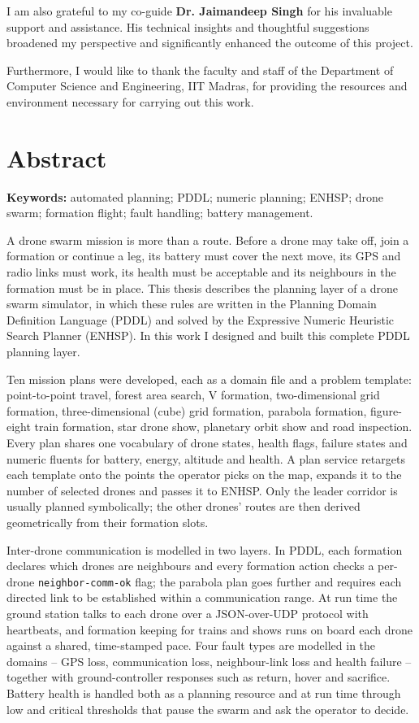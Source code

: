 \documentclass[11pt,a4paper,oneside]{report}
\newcommand{\coadvisor}{Dr. Jaimandeep Singh}
\newlength{\tocgap}\setlength{\tocgap}{1.0em}
\newcommand{\frontentry}[2]{\addvspace{\tocgap}\noindent\textbf{#1}\hfill\textbf{#2}\par}
\newcommand{\addfront}[1]{\addtocontents{toc}{\protect\frontentry{#1}{\thepage}}}
\newcommand{\code}[1]{\texttt{#1}}
\begin{document}
I am also grateful to my co-guide \textbf{\coadvisor} for his invaluable support and assistance.
His technical insights and thoughtful suggestions broadened my perspective and significantly
enhanced the outcome of this project.

Furthermore, I would like to thank the faculty and staff of the Department of Computer Science
and Engineering, IIT Madras, for providing the resources and environment necessary for carrying
out this work.

\chapter*{Abstract}
\addfront{ABSTRACT}
\noindent\textbf{Keywords:} automated planning; PDDL; numeric planning; ENHSP; drone swarm;
formation flight; fault handling; battery management.

\medskip
A drone swarm mission is more than a route. Before a drone may take off, join a formation or
continue a leg, its battery must cover the next move, its GPS and radio links must work, its
health must be acceptable and its neighbours in the formation must be in place. This thesis
describes the planning layer of a drone swarm simulator, in which these rules are written in the
Planning Domain Definition Language (PDDL) and solved by the Expressive Numeric Heuristic Search
Planner (ENHSP). In this work I designed and built this complete PDDL planning layer.

Ten mission plans were developed, each as a domain file and a problem template: point-to-point
travel, forest area search, V formation, two-dimensional grid formation, three-dimensional
(cube) grid formation, parabola formation, figure-eight train formation, star drone show,
planetary orbit show and road inspection. Every plan shares one vocabulary of drone states,
health flags, failure states and numeric fluents for battery, energy, altitude and health. A
plan service retargets each template onto the points the operator picks on the map, expands it
to the number of selected drones and passes it to ENHSP. Only the leader corridor is usually
planned symbolically; the other drones' routes are then derived geometrically from their
formation slots.

Inter-drone communication is modelled in two layers. In PDDL, each formation declares which
drones are neighbours and every formation action checks a per-drone \code{neighbor-comm-ok}
flag; the parabola plan goes further and requires each directed link to be established within
a communication range. At run time the ground station talks to each drone over a JSON-over-UDP
protocol with heartbeats, and formation keeping for trains and shows runs on board each drone
against a shared, time-stamped pace. Four fault types are modelled in the domains -- GPS loss,
communication loss, neighbour-link loss and health failure -- together with ground-controller
responses such as return, hover and sacrifice. Battery health is handled both as a planning
resource and at run time through low and critical thresholds that pause the swarm and ask the
operator to decide.
\end{document}
